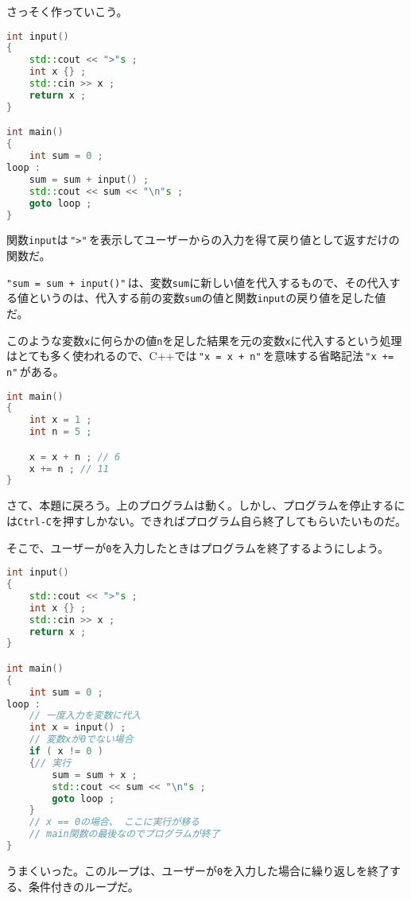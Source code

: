 さっそく作っていこう。

\begin{lstlisting}[language={C++}]
int input()
{
    std::cout << ">"s ;
    int x {} ;
    std::cin >> x ;
    return x ;
}

int main()
{
    int sum = 0 ;
loop :
    sum = sum + input() ;
    std::cout << sum << "\n"s ;
    goto loop ;
}
\end{lstlisting}

関数\texttt{input}は\,\texttt{">"}\,を表示してユーザーからの入力を得て戻り値として返すだけの関数だ。

\texttt{"sum = sum + input()"}\,は、変数\texttt{sum}に新しい値を代入するもので、その代入する値というのは、代入する前の変数\texttt{sum}の値と関数\texttt{input}の戻り値を足した値だ。

このような変数\texttt{x}に何らかの値\texttt{n}を足した結果を元の変数\texttt{x}に代入するという処理はとても多く使われるので、C++では\,\texttt{"x = x + n"}\,を意味する省略記法\,\texttt{"x += n"}\,がある。

\begin{lstlisting}[language={C++}]
int main()
{
    int x = 1 ;
    int n = 5 ;

    x = x + n ; // 6
    x += n ; // 11
}
\end{lstlisting}

さて、本題に戻ろう。上のプログラムは動く。しかし、プログラムを停止するには\texttt{Ctrl-C}を押すしかない。できればプログラム自ら終了してもらいたいものだ。

そこで、ユーザーが\texttt{0}を入力したときはプログラムを終了するようにしよう。

\begin{lstlisting}[language={C++}]
int input()
{
    std::cout << ">"s ;
    int x {} ;
    std::cin >> x ;
    return x ;
}

int main()
{
    int sum = 0 ;
loop :
    // 一度入力を変数に代入
    int x = input() ;
    // 変数xが0でない場合
    if ( x != 0 )
    {// 実行
        sum = sum + x ;
        std::cout << sum << "\n"s ;
        goto loop ;
    }
    // x == 0の場合、 ここに実行が移る
    // main関数の最後なのでプログラムが終了
}
\end{lstlisting}

うまくいった。このループは、ユーザーが\texttt{0}を入力した場合に繰り返しを終了する、条件付きのループだ。


